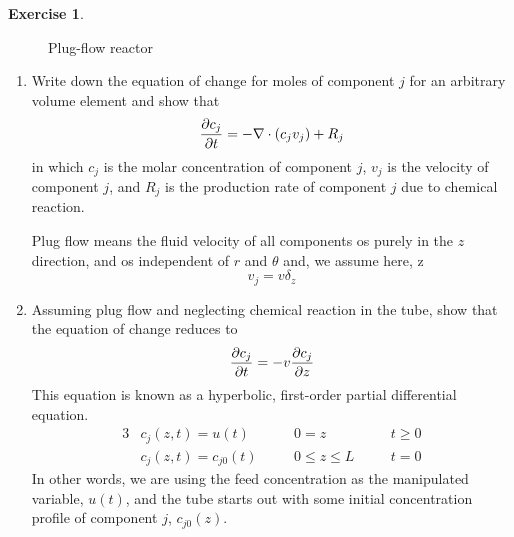 \documentclass[11pt,a4paper]{report}
\theoremstyle{definition}\newtheorem{exercise}{Exercise}[chapter]
\begin{document}
\begin{exercise}
\begin{figure}[htbp]
\caption{Plug-flow reactor}
\label{fig:exer1-2}
\end{figure}

\begin{enumerate}[label=(\alph*)]
    \item Write down the equation of change for moles of component $j$ for an arbitrary volume element and show that
    \begin{equation}
        \pdv{c_j}{t}=-\nabla \cdot (c_j v_j)+R_j
    \end{equation}
    in which $c_j$ is the molar concentration of component $j$, $v_j$ is the velocity of component $j$, and $R_j$ is the production rate of component $j$ due to chemical reaction.

    Plug flow means the fluid velocity of all components os purely in the $z$ direction, and os independent of $r$ and $\theta$ and, we assume here, z
    \begin{equation}
        v_j=v\delta_z
    \end{equation}
    
    \item Assuming plug flow and neglecting chemical reaction in the tube, show that the equation of change reduces to 
    \begin{equation}\label{equ:exer1-2}
        \pdv{c_j}{t}=-v\pdv{c_j}{z}
    \end{equation}
    This equation is known as a hyperbolic, first-order partial differential equation.
    \begin{alignat}{3}
        &c_j(z,t)=u(t) &&0=z &&t\ge 0  \\
        &c_j(z,t)=c_{j0}(t) \quad &&0\le z\le L\quad &&t=0 
    \end{alignat}
    In other words, we are using the feed concentration as the manipulated variable, $u(t)$, and the tube starts out with some initial concentration profile of component $j$, $c_{j0}(z)$.
    

\end{enumerate}
\end{exercise}
\end{document}

